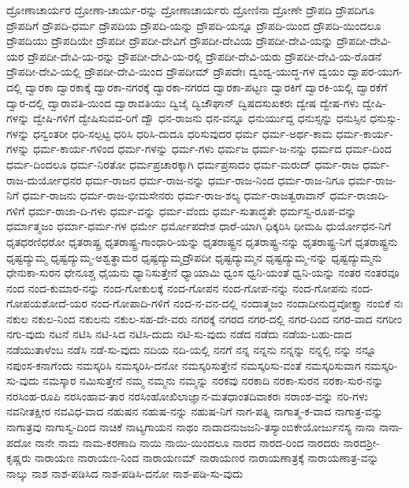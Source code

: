 {ದ್ರೋಣಾಚಾರ್ಯರ
ದ್ರೋಣಾ-ಚಾರ್ಯ-ರನ್ನು
ದ್ರೋಣಾಚಾರ್ಯರು
ದ್ರೋಣಿನಾ
ದ್ರೋಣೇ
ದ್ರೌಪದಿ
ದ್ರೌಪದಿಗೂ
ದ್ರೌಪದಿಗೆ
ದ್ರೌಪದಿ-ಧರ್ಮ
ದ್ರೌಪದಿಯ
ದ್ರೌಪದಿ-ಯನ್ನು
ದ್ರೌಪದಿ-ಯನ್ನೂ
ದ್ರೌಪದಿ-ಯಿಂದ
ದ್ರೌಪದಿ-ಯಿಂದಲೂ
ದ್ರೌಪದಿಯು
ದ್ರೌಪದಿಯೇ
ದ್ರೌಪದೀ
ದ್ರೌಪದೀ-ದೇವಿಗೆ
ದ್ರೌಪದೀ-ದೇವಿಯ
ದ್ರೌಪದೀ-ದೇವಿ-ಯನ್ನು
ದ್ರೌಪದೀ-ದೇವಿ-ಯರ
ದ್ರೌಪದೀ-ದೇವಿ-ಯ-ರನ್ನು
ದ್ರೌಪದೀ-ದೇವಿ-ಯ-ರಲ್ಲಿ
ದ್ರೌಪದೀ-ದೇವಿ-ಯರು
ದ್ರೌಪದೀ-ದೇವಿ-ಯ-ರೊಡನೆ
ದ್ರೌಪದೀ-ದೇವಿ-ಯಲ್ಲಿ
ದ್ರೌಪದೀ-ದೇವಿ-ಯಿಂದ
ದ್ರೌಪದೀಮ್
ದ್ರೌಪದೇಃ
ದ್ವಂದ್ವ-ಯುದ್ಧ-ಗಳ
ದ್ವಯಂ
ದ್ವಾಪರ-ಯುಗ-ದಲ್ಲಿ
ದ್ವಾರಕಾ
ದ್ವಾರಕಾಕ್ಕೆ
ದ್ವಾರಕಾ-ನಗರಕ್ಕೆ
ದ್ವಾರಕಾ-ನಗರದ
ದ್ವಾರಕಾ-ಪಟ್ಟಣ
ದ್ವಾರಕಿಗೆ
ದ್ವಾರಕಿ-ಯಲ್ಲಿ
ದ್ವಾರಕೆಗೆ
ದ್ವಾರ-ದಲ್ಲಿ
ದ್ವಾರಾವತಿ-ಯಿಂದ
ದ್ವಾರಾವತಿಯು
ದ್ವಿಜೈ
ದ್ವಿಜೌಘಾನ್
ದ್ವಿಷದಸುಖಕರಃ
ದ್ವೇಷ
ದ್ವೇಷ-ಗಳು
ದ್ವೇಷಿ-ಗಳನ್ನು
ದ್ವೇಷಿ-ಗಳಿಗೆ
ದ್ವೇಷಿಸುವವ-ರಿಗೆ
ದ್ವೌ
ಧನ-ರಾಜನು
ಧನ-ವನ್ನೂ
ಧನುರ್ಯುದ್ದ
ಧನುಸ್ಸನ್ನು
ಧನುಸ್ಸಿನ
ಧನುಸ್ಸು-ಗಳನ್ನು
ಧನ್ವಂತರೀ
ಧರಿ-ಸಲ್ಪಟ್ಟ
ಧರಿಸಿ
ಧರಿಸಿ-ದುದೂ
ಧರಿಸುವುದರ
ಧರ್ಮ
ಧರ್ಮ-ಅರ್ಥ-ಕಾಮ
ಧರ್ಮ-ಕಾರ್ಯ-ಗಳನ್ನು
ಧರ್ಮ-ಕಾರ್ಯ-ಗಳಿಂದ
ಧರ್ಮ-ಗಳನ್ನು
ಧರ್ಮ-ಗಳು
ಧರ್ಮಜ
ಧರ್ಮ-ಜ-ನನ್ನು
ಧರ್ಮದ
ಧರ್ಮ-ದಿಂದ
ಧರ್ಮ-ದಿಂದಲೂ
ಧರ್ಮ-ನಿರತೋ
ಧರ್ಮಪ್ರಚಾರಕ್ಕಾಗಿ
ಧರ್ಮಪ್ರಸಾದಂ
ಧರ್ಮ-ಮರುದ್
ಧರ್ಮ-ರಾಜ
ಧರ್ಮ-ರಾಜ-ದುರ್ಯೋಧನರ
ಧರ್ಮ-ರಾಜನ
ಧರ್ಮ-ರಾಜ-ನನ್ನು
ಧರ್ಮ-ರಾಜ-ನಿಂದ
ಧರ್ಮ-ರಾಜ-ನಿಗೂ
ಧರ್ಮ-ರಾಜ-ನಿಗೆ
ಧರ್ಮ-ರಾಜನು
ಧರ್ಮ-ರಾಜ-ಭೀಮಸೇನರು
ಧರ್ಮ-ರಾಜ-ಶಲ್ಯ
ಧರ್ಮ-ರಾಜತ್ವರಾವಾನ್
ಧರ್ಮ-ರಾಜಾದಿ-ಗಳಿಗೆ
ಧರ್ಮ-ರಾಜಾ-ದಿ-ಗಳು
ಧರ್ಮ-ವನ್ನು
ಧರ್ಮ-ವೆಂದು
ಧರ್ಮ-ಸುತಾದ್ಧತೇ
ಧರ್ಮಸ್ವ-ರೂಪ-ವನ್ನು
ಧರ್ಮಾತ್ಮಜಂ
ಧರ್ಮಾ-ಧರ್ಮ-ಗಳ
ಧರ್ಮೇ
ಧರ್ಮೋಪದೇಶ
ಧಾರೆ-ಯಾಗಿ
ಧಿಕ್ಕರಿಸಿ
ಧೀಮಹಿ
ಧುರ್ಯೋಧನ-ನಿಗೆ
ಧೃತಧರಣಿಧರೋ
ಧೃತರಾಷ್ಟ್ರ
ಧೃತರಾಷ್ಟ್ರ-ಗಾಂಧಾರಿ-ಯನ್ನು
ಧೃತರಾಷ್ಟ್ರನ
ಧೃತರಾಷ್ಟ್ರ-ನನ್ನು
ಧೃತರಾಷ್ಟ್ರ-ನಿಗೆ
ಧೃತರಾಷ್ಟ್ರನು
ಧೃಷ್ಟದ್ಯುಮ್ಮ
ಧೃಷ್ಟದ್ಯುಮ್ಮ-ಅಶ್ವತ್ಥಾಮರ
ಧೃಷ್ಟದ್ಯುಮ್ಮದ್ರೌಪದೀ
ಧೃಷ್ಟದ್ಯುಮ್ಮನ
ಧೃಷ್ಟದ್ಯುಮ್ಮ-ನನ್ನು
ಧೃಷ್ಟದ್ಯುಮ್ಮನು
ಧೇನುಕಾ-ಸುರನ
ಧೇನೂಶ್ಚ
ಧೈಯನು
ಧ್ಯಾನಿಸುತ್ತೇನೆ
ಧ್ಯಾಯಾಮಿ
ಧ್ವಂಸ
ಧ್ವನಿ-ಯಂತೆ
ಧ್ವನಿ-ಯನ್ನು
ನಂತರ
ನಂತರವೂ
ನಂದ
ನಂದ-ಕುಮಾರ-ನನ್ನು
ನಂದ-ಗೋಕುಲಕ್ಕೆ
ನಂದ-ಗೋಪನ
ನಂದ-ಗೋಪ-ನನ್ನು
ನಂದ-ಗೋಪನು
ನಂದ-ಗೋಪಯಶೋದೆ-ಯರ
ನಂದ-ಗೋಪಾದಿ-ಗಳಿಗೆ
ನಂದ-ನ-ವನ-ದಲ್ಲಿ
ನಂದಾತ್ಮಜಂ
ನಂದಾದೀನುದ್ಧವೋಕ್ತ್ಯಾ
ನಂಬಿಕೆ
ನಃ
ನಕುಲ
ನಕುಲ-ನಿಂದ
ನಕುಲನು
ನಕುಲ-ಸಹ-ದೇ-ವರು
ನಗರಕ್ಕೆ
ನಗರದ
ನಗರ-ದಲ್ಲಿ
ನಗರ-ದಿಂದ
ನಗರ-ವಾದ
ನಗರೀಂ
ನಗು-ವುದು
ನಟನೆ
ನಟಿಸಿ
ನಟಿ-ಸಿದ
ನಟಿಸಿ-ದುದು
ನಟಿ-ಸು-ವುದು
ನಡೆದ
ನಡೆದು
ನಡೆಯ-ಬಹು-ದಾದ
ನಡೆಯುತಾಳೆಂಬ
ನಡೆಸಿ
ನಡೆ-ಸು-ವುದು
ನದಿಯ
ನದಿ-ಯಲ್ಲಿ
ನನಗೆ
ನನ್ನ
ನನ್ನನು
ನನ್ನನ್ನು
ನನ್ನಲ್ಲಿ
ನನ್ನು
ನನ್ನೂ
ನಪುಂಸ-ಕನಾಗೆಂದು
ನಮಸ್ಕರಿಸಿ
ನಮಸ್ಕರಿಸಿ-ದನೋ
ನಮಸ್ಕರಿಸುತ್ತೇನೆ
ನಮಸ್ಕರಿಸು-ವಂತೆ
ನಮಸ್ಕರಿಸುವಾಗ
ನಮಸ್ಕರಿ-ಸು-ವುದು
ನಮಸ್ಕಾರ
ನಮಿಸುತ್ತೇನೆ
ನಮ್ಮ
ನಮ್ಮನು
ನಮ್ಮನ್ನು
ನರಕವು
ನರಕಾದಿ
ನರಕಾ-ಸುರನ
ನರಕಾ-ಸುರ-ನನ್ನು
ನರಸಿಂಹ-ರೂಪಿ
ನರಸಿಂಹಾವ-ತಾರ
ನರಸಿಂಹೋಖಿಲಾಜ್ಞಾನ-ಮತಧಾಂತದಿವಾಕರಃ
ನರಾಂಶ-ವನ್ನು
ನರಿ-ಗಳು
ನವನೀತಕ್ಷೀರ
ನವವಿಧ-ವಾದ
ನಹುಷನ
ನಹುಷ-ನನ್ನು
ನಹುಷ-ನಿಗೆ
ನಾಗ-ಪತ್ನಿ
ನಾಗಾತ್ಮ-ಕ-ವಾದ
ನಾಗಾತ್ರ-ವನ್ನು
ನಾಗಾತ್ರವು
ನಾಗಾಸ್ವ-ದಿಂದ
ನಾಚಿಕೆ
ನಾಟ್ಯಗಾಯನ
ನಾಥಂ
ನಾದಾದನುಜಜನಿ-ತಸ್ಯಾಂಬಿಕೇಯೋರ್ಜುನಸ್ಯ
ನಾನಾ
ನಾನಾ-ಪದೋ
ನಾನೇ
ನಾಮ
ನಾಮ-ಕರಣಾದಿ
ನಾಯಿ
ನಾಯಿ-ಯಿಂದಲೂ
ನಾರದ
ನಾರದ-ರಿಂದ
ನಾರದರು
ನಾರದಶ್ರೀ-ಕೃಷ್ಣರು
ನಾರಾಯಣ
ನಾರಾಯಣ-ನಿಂದ
ನಾರಾಯಣಮ್
ನಾರಾಯಣರ
ನಾರಾಯಣಾತ್ರಕ್ಕೆ
ನಾರಾಯಣಾತ್ರ-ವನ್ನು
ನಾಲ್ಕು
ನಾಶ
ನಾಶ-ಪಡಿಸಿದ
ನಾಶ-ಪಡಿಸಿ-ದನೋ
ನಾಶ-ಪಡಿ-ಸು-ವುದು
}
